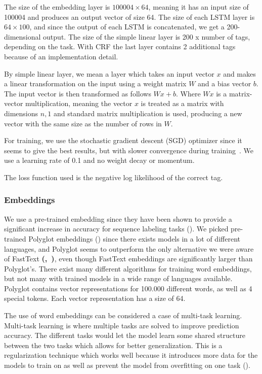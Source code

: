 The size of the embedding layer is $100004 \times 64$, meaning it has an input
size of 100004 and produces an output vector of size 64. The size of each LSTM
layer is $64 \times 100$, and since the output of each LSTM is concatenated, we
get a 200-dimensional output. The size of the simple linear layer is 200 x
number of tags, depending on the task. With CRF the last layer contains 2
additional tags because of an implementation detail.

By simple linear layer, we mean a layer which takes an input vector $x$ and
makes a linear transformation on the input using a weight matrix $W$ and a bias
vector $b$. The input vector is then transformed as follows $W x + b$.
Where $W x$ is a matrix-vector multiplication, meaning the vector $x$ is
treated as a matrix with dimensions $n,1$ and standard matrix multiplication is
used, producing a new vector with the same size as the number of rows in $W$.

For training, we use the stochastic gradient descent (SGD) optimizer since it
seems to give the best results, but with slower convergence during
training~\cite{yang2018design}. We use a learning rate of 0.1 and no weight
decay or momentum.

The loss function used is the negative log likelihood of the correct tag. 

\subsubsection{Embeddings}

We use a pre-trained embedding since they have been shown to provide a
significant increase in accuracy for sequence labeling tasks
(\cite{yang2018design}). We picked pre-trained Polyglot embeddings
(\cite{polyglot:2013:ACL-CoNLL}) since there exists models in a lot of different
languages, and Polyglot seems to outperform the only alternative we were aware
of FastText \textbf{(\cite{joulin2016bagoftricks},~\cite{plank2018distant})},
even though FastText embeddings are significantly larger than Polyglot's. There
exist many different algorithms for training word embeddings, but not many with
trained models in a wide range of languages available. Polyglot contains vector
representations for 100.000 different words, as well as 4 special tokens. Each
vector representation has a size of 64.

The use of word embeddings can be considered a case of multi-task learning.
Multi-task learning is where multiple tasks are solved to improve prediction
accuracy. The different tasks would let the model learn some shared structure
between the two tasks which allows for better generalization. This is a
regularization technique which works well because it introduces more data for
the models to train on as well as prevent the model from overfitting on one
task (\cite{goodfellow2016deep}).

